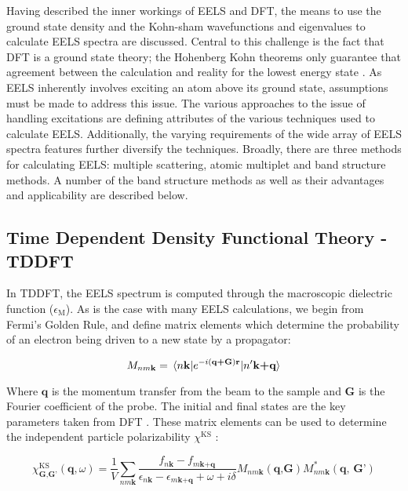 
Having described the inner workings of EELS and DFT, the means to use the ground state density and the Kohn-sham wavefunctions and eigenvalues to calculate EELS spectra are discussed.  Central to this challenge is the fact that DFT is a ground state theory; the Hohenberg Kohn theorems only guarantee that agreement between the calculation and reality for the lowest energy state \cite{hohenberg_inhomogeneous_1964}. As EELS inherently involves exciting an atom above its ground state, assumptions must be made to address this issue. The various approaches to the issue of handling excitations are defining attributes of the various techniques used to calculate EELS.  Additionally, the varying requirements of the wide array of EELS spectra features further diversify the techniques. Broadly, there are three methods for calculating EELS: multiple scattering, atomic multiplet and band structure methods.  A number of the band structure methods as well as their advantages and applicability are described below.


\subsection{Time Dependent Density Functional Theory -TDDFT}
In TDDFT, the EELS spectrum is computed through the macroscopic dielectric function ($\epsilon_{\mathrm{M}}$). As is the case with many EELS calculations, we begin from Fermi's Golden Rule, and define matrix elements which determine the probability of an electron being driven to a new state by a propagator:

\begin{equation}
M_{nm\textbf{k}} = \mel{n\textbf{k}}{e^{-i(\textbf{q+G})\textbf{r}}}{n'\textbf{k+q}}
\label{FGR}
\end{equation}

Where $\textbf{q}$ is the momentum transfer from the beam to the sample and \textbf{G} is the Fourier coefficient of the probe. The initial and final states are the key parameters taken from DFT \cite{exciting}.  These matrix elements can be used to determine the independent particle polarizability $\chi^{\mathrm{KS}}$ \cite{exciting}: 


\begin{equation}
\chi^{\mathrm{KS}}_{\mathrm{\textbf{G,G'}}}(\textbf{q},\omega)=\frac{1}{V}\sum_{nm\textbf{k}}\frac{f_{n\textbf{k}}-f_{m\textbf{k+q}}}{\epsilon_{n\textbf{k}}-\epsilon_{m\textbf{k+q}}+\omega + i\delta} M_{nm\textbf{k}}(\textbf{q,G})M^*_{nm\textbf{k}}(\textbf{q, G'})
\end{equation}

